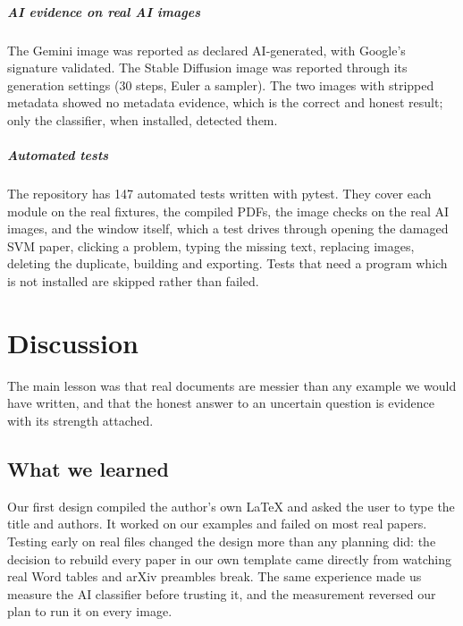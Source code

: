 \documentclass[11pt,a4paper,oneside,openany]{book}
\begin{document}
\paragraph{AI evidence on real AI images}
The Gemini image was reported as declared AI-generated, with Google's signature validated. The Stable
Diffusion image was reported through its generation settings (30 steps, Euler a sampler). The two images
with stripped metadata showed no metadata evidence, which is the correct and honest result; only the
classifier, when installed, detected them.

\paragraph{Automated tests}
The repository has 147 automated tests written with pytest. They cover each module on the real fixtures,
the compiled PDFs, the image checks on the real AI images, and the window itself, which a test drives
through opening the damaged SVM paper, clicking a problem, typing the missing text, replacing images,
deleting the duplicate, building and exporting. Tests that need a program which is not installed are
skipped rather than failed.

\chapter{Discussion}\label{ch:disc}

\begin{takeaway}
The main lesson was that real documents are messier than any example we would have written, and that the
honest answer to an uncertain question is evidence with its strength attached.
\end{takeaway}

\section{What we learned}
Our first design compiled the author's own \LaTeX{} and asked the user to type the title and authors. It
worked on our examples and failed on most real papers. Testing early on real files changed the design
more than any planning did: the decision to rebuild every paper in our own template came directly from
watching real Word tables and arXiv preambles break. The same experience made us measure the AI classifier
before trusting it, and the measurement reversed our plan to run it on every image.
\end{document}
